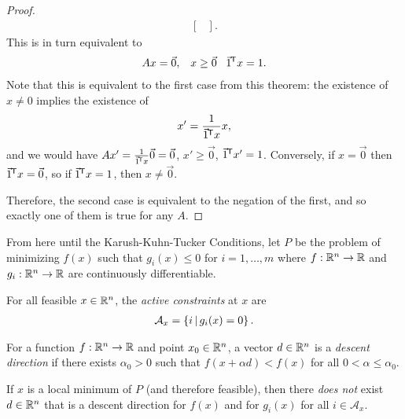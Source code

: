 \begin{proof}
\begin{align*}
\begin{bmatrix}
        \end{bmatrix}.
    \end{align*}
    This is in turn equivalent to
    \begin{align*}
        Ax = \vec{0},\;\;\;x \geq \vec{0}\;\;\;{\vec{1}}^{\mkern-1.5mu\mathsf{T}}x = 1.
    \end{align*}
    Note that this is equivalent to the first case from this theorem: the existence of $x \neq 0$ implies the existence of
    \begin{align*}
        x' = \frac{1}{{\vec{1}}^{\mkern-1.5mu\mathsf{T}}x}x,
    \end{align*}
    and we would have $Ax' = \frac{1}{{\vec{1}}^{\mkern-1.5mu\mathsf{T}}x}\vec{0} = \vec{0}$, $x' \geq \vec{0}$, ${\vec{1}}^{\mkern-1.5mu\mathsf{T}}x' = 1$. Conversely, if $x = \vec{0}$ then ${\vec{1}}^{\mkern-1.5mu\mathsf{T}}x = \vec{0}$, so if ${\vec{1}}^{\mkern-1.5mu\mathsf{T}}x = 1$, then $x \neq \vec{0}$.

    Therefore, the second case is equivalent to the negation of the first, and so exactly one of them is true for any $A$.
\end{proof}

\begin{rmk}
    From here until the Karush-Kuhn-Tucker Conditions, let $P$ be the problem of minimizing $f(x)$ such that $g_i(x) \leq 0$ for $i = 1, \ldots, m$ where $f: \mathbb{R}^n \to \mathbb{R}$ and $g_i: \mathbb{R}^n \to \mathbb{R}$ are continuously differentiable.
\end{rmk}

\begin{defn}
    For all feasible $x \in \mathbb{R}^n$, the \emph{active constraints} at $x$ are
    \begin{align*}
        \mathcal{A}_x = \left\{i \,\middle|\, g_i(x) = 0\right\}.
    \end{align*}
\end{defn}

\begin{defn}
    For a function $f: \mathbb{R}^n \to \mathbb{R}$ and point $x_0 \in \mathbb{R}^n$, a vector $d \in \mathbb{R}^n$ is a \emph{descent direction} if there exists $\alpha_0 > 0$ such that $f(x + \alpha d) < f(x)$ for all $0 < \alpha \leq \alpha_0$.
\end{defn}

\begin{lemma}\label{kkt-lemma-1}
    If $x$ is a local minimum of $P$ (and therefore feasible), then there \emph{does not} exist $d \in \mathbb{R}^n$ that is a descent direction for $f(x)$ and for $g_i(x)$ for all $i \in \mathcal{A}_x$. 
\end{lemma}

